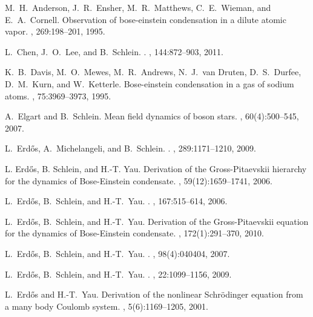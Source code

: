 \documentclass[11pt,a4paper]{article}
\newcommand{\done}{}
\begin{document}
\begin{thebibliography}{10}

\bibitem{BEC1}\done{}
M.~H.~Anderson, J.~R.~Ensher, M.~R.~Matthews, C.~E.~Wieman, and E.~A.~Cornell.
\newblock Observation of bose-einstein condensation in a dilute atomic vapor.
, 269:198--201, 1995.

L.~{Chen}, J.~O.~{Lee}, and B.~{Schlein}.
.
, 144:872--903, 2011.

K.~B.~Davis, M.~O.~Mewes, M.~R.~Andrews, N.~J.~van Druten, D.~S.~Durfee, D.~M.~Kurn, and W.~Ketterle.
\newblock Bose-einstein condensation in a gas of sodium atoms.
, 75:3969--3973, 1995.

A.~Elgart and B.~Schlein.
\newblock Mean field dynamics of boson stars.
, 60(4):500--545, 2007.

L.~{Erd{\H o}s}, A.~{Michelangeli}, and B.~{Schlein}.
.
, 289:1171--1210, 2009.

L. Erd{\H{o}}s, B. Schlein, and H.-T. Yau.
\newblock Derivation of the {G}ross-{P}itaevskii hierarchy for the dynamics of
  {B}ose-{E}instein condensate.
, 59(12):1659--1741, 2006.

L.~{Erd{\H o}s}, B.~{Schlein}, and H.-T.~{Yau}.
.
, 167:515--614, 2006.

L.~Erd{\H{o}}s, B.~Schlein, and H.-T.~Yau.
\newblock Derivation of the {G}ross-{P}itaevskii equation for the dynamics of
  {B}ose-{E}instein condensate.
, 172(1):291--370, 2010.

L.~{Erd{\H o}s}, B.~{Schlein}, and H.-T.~{Yau}.
.
, 98(4):040404, 2007.

L.~{Erd{\H o}s}, B.~{Schlein}, and H.-T.~{Yau}.
.
, 22:1099--1156, 2009.
  
L.~Erd{\H{o}}s and H.-T.~Yau.
\newblock Derivation of the nonlinear {S}chr\"odinger equation from a many body
  {C}oulomb system.
, 5(6):1169--1205, 2001.


\end{thebibliography}
\end{document}
